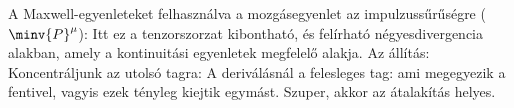    A Maxwell-egyenleteket felhasználva a mozgásegyenlet az impulzussűrűségre ($\minv{P}^{\mu}$):
   Itt ez a tenzorszorzat kibontható, és felírható négyesdivergencia alakban, amely a kontinuitási egyenletek megfelelő alakja.
   Az állítás:
   Koncentráljunk az utolsó tagra:
   A deriválásnál a felesleges tag:
   ami megegyezik a fentivel, vagyis ezek tényleg kiejtik egymást.
   Szuper, akkor az átalakítás helyes. 
   
